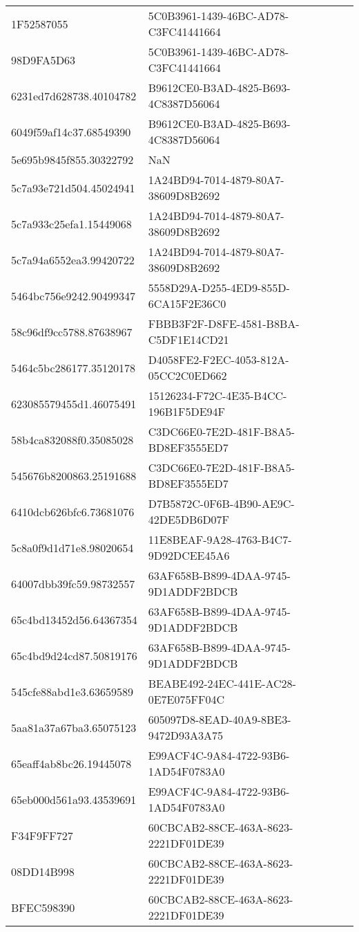 \begin{tabular}{ll}
1F52587055 & 5C0B3961-1439-46BC-AD78-C3FC41441664 \\
98D9FA5D63 & 5C0B3961-1439-46BC-AD78-C3FC41441664 \\
6231ed7d628738.40104782 & B9612CE0-B3AD-4825-B693-4C8387D56064 \\
6049f59af14c37.68549390 & B9612CE0-B3AD-4825-B693-4C8387D56064 \\
5e695b9845f855.30322792 & NaN \\
5c7a93e721d504.45024941 & 1A24BD94-7014-4879-80A7-38609D8B2692 \\
5c7a933c25efa1.15449068 & 1A24BD94-7014-4879-80A7-38609D8B2692 \\
5c7a94a6552ea3.99420722 & 1A24BD94-7014-4879-80A7-38609D8B2692 \\
5464bc756e9242.90499347 & 5558D29A-D255-4ED9-855D-6CA15F2E36C0 \\
58c96df9cc5788.87638967 & FBBB3F2F-D8FE-4581-B8BA-C5DF1E14CD21 \\
5464c5bc286177.35120178 & D4058FE2-F2EC-4053-812A-05CC2C0ED662 \\
623085579455d1.46075491 & 15126234-F72C-4E35-B4CC-196B1F5DE94F \\
58b4ca832088f0.35085028 & C3DC66E0-7E2D-481F-B8A5-BD8EF3555ED7 \\
545676b8200863.25191688 & C3DC66E0-7E2D-481F-B8A5-BD8EF3555ED7 \\
6410dcb626bfc6.73681076 & D7B5872C-0F6B-4B90-AE9C-42DE5DB6D07F \\
5c8a0f9d1d71e8.98020654 & 11E8BEAF-9A28-4763-B4C7-9D92DCEE45A6 \\
64007dbb39fc59.98732557 & 63AF658B-B899-4DAA-9745-9D1ADDF2BDCB \\
65c4bd13452d56.64367354 & 63AF658B-B899-4DAA-9745-9D1ADDF2BDCB \\
65c4bd9d24cd87.50819176 & 63AF658B-B899-4DAA-9745-9D1ADDF2BDCB \\
545cfe88abd1e3.63659589 & BEABE492-24EC-441E-AC28-0E7E075FF04C \\
5aa81a37a67ba3.65075123 & 605097D8-8EAD-40A9-8BE3-9472D93A3A75 \\
65eaff4ab8bc26.19445078 & E99ACF4C-9A84-4722-93B6-1AD54F0783A0 \\
65eb000d561a93.43539691 & E99ACF4C-9A84-4722-93B6-1AD54F0783A0 \\
F34F9FF727 & 60CBCAB2-88CE-463A-8623-2221DF01DE39 \\
08DD14B998 & 60CBCAB2-88CE-463A-8623-2221DF01DE39 \\
BFEC598390 & 60CBCAB2-88CE-463A-8623-2221DF01DE39 \\

\end{tabular}
